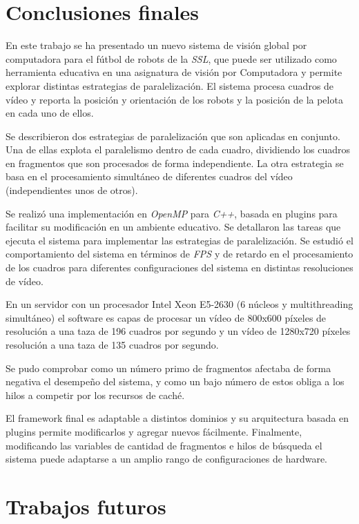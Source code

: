 
\section{Conclusiones finales}

\label{concluciones}

En este trabajo se ha presentado un nuevo sistema de visión global por
computadora para el fútbol de robots de la \emph{SSL}, que puede ser utilizado
como herramienta educativa en una asignatura de visión por Computadora y permite
explorar distintas estrategias de paralelización. El sistema procesa cuadros de
vídeo y reporta la posición y orientación de los robots y la posición de la
pelota en cada uno de ellos.

Se describieron dos estrategias de paralelización que son aplicadas en conjunto.
Una de ellas explota el paralelismo dentro de cada cuadro, dividiendo los
cuadros en fragmentos que son procesados de forma independiente. La otra
estrategia se basa en el procesamiento simultáneo de diferentes cuadros del
vídeo (independientes unos de otros).

Se realizó una implementación en \emph{OpenMP} para \emph{C++}, basada en
plugins para facilitar su modificación en un ambiente educativo. Se detallaron
las tareas que ejecuta el sistema para implementar las estrategias de
paralelización. Se estudió el comportamiento del sistema en términos de
\emph{FPS} y de retardo en el procesamiento de los cuadros para diferentes
configuraciones del sistema en distintas resoluciones de vídeo.

En un servidor con un procesador Intel Xeon E5-2630 (6 núcleos y multithreading
simultáneo) el software es capas de procesar un vídeo de 800x600 píxeles de
resolución a una taza de 196 cuadros por segundo y un vídeo de 1280x720 píxeles
resolución a una taza de 135 cuadros por segundo.

Se pudo comprobar como un número primo de fragmentos afectaba de forma negativa
el desempeño del sistema, y como un bajo número de estos obliga a los hilos a
competir por los recursos de caché.

El framework final es adaptable a distintos dominios y su arquitectura basada en
plugins permite modificarlos y agregar nuevos fácilmente. Finalmente,
modificando las variables de cantidad de fragmentos e hilos de búsqueda el
sistema puede adaptarse a un amplio rango de configuraciones de hardware.

\section{Trabajos futuros}

